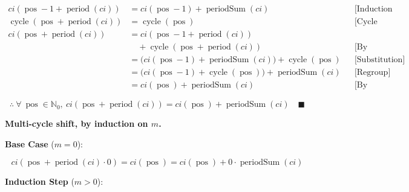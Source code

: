\begin{equation*}
\begin{aligned}
ci(\operatorname{pos} - 1 + \operatorname{period}(ci)) &= ci(\operatorname{pos} - 1) + \operatorname{periodSum}(ci)
  &&\text{[Induction Hypothesis]} \\
\operatorname{cycle}(\operatorname{pos} + \operatorname{period}(ci)) &= \operatorname{cycle}(\operatorname{pos})
  &&\text{[Cycle periodicity]} \\
ci(\operatorname{pos} + \operatorname{period}(ci)) &= ci(\operatorname{pos} - 1 + \operatorname{period}(ci)) \\
    &\quad + \operatorname{cycle}(\operatorname{pos} + \operatorname{period}(ci))
  &&\text{[By Definition]} \\
&= \big(ci(\operatorname{pos} - 1) + \operatorname{periodSum}(ci)\big) + \operatorname{cycle}(\operatorname{pos})
  &&\text{[Substitution]} \\
&= \big(ci(\operatorname{pos} - 1) + \operatorname{cycle}(\operatorname{pos})\big) + \operatorname{periodSum}(ci)
  &&\text{[Regroup]} \\
&= ci(\operatorname{pos}) + \operatorname{periodSum}(ci)
  &&\text{[By Definition]}
\end{aligned}
\end{equation*}

\begin{equation*}
\therefore \ \forall \ \operatorname{pos} \in \mathbb{N}_0,\ ci(\operatorname{pos} + \operatorname{period}(ci)) = ci(\operatorname{pos}) + \operatorname{periodSum}(ci) \quad \blacksquare
\end{equation*}

\textbf{Multi-cycle shift, by induction on $m$.}

\textbf{Base Case} ($m = 0$):

\begin{equation*}
ci(\operatorname{pos} + \operatorname{period}(ci) \cdot 0) = ci(\operatorname{pos}) = ci(\operatorname{pos}) + 0 \cdot \operatorname{periodSum}(ci)
\end{equation*}

\textbf{Induction Step} ($m > 0$):


